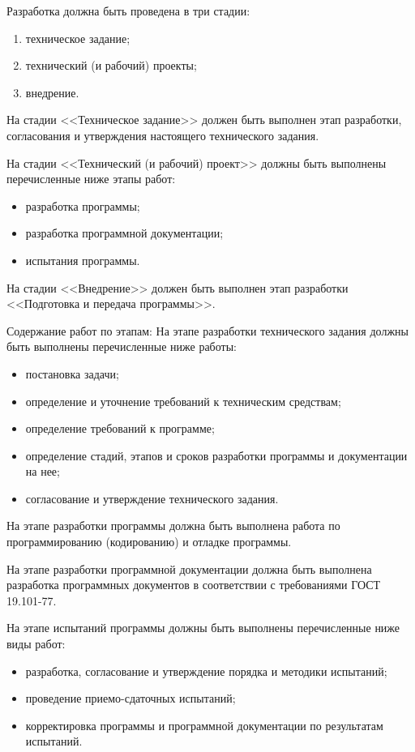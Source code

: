 \documentclass[a4page]{article}
\begin{document}
Разработка должна быть проведена в три стадии:

\begin{enumerate}
  \item техническое задание;
  \item технический (и рабочий) проекты;
  \item внедрение.
\end{enumerate}

На стадии <<Техническое задание>> должен быть выполнен этап разработки, согласования и утверждения настоящего технического задания.

На стадии <<Технический (и рабочий) проект>> должны быть выполнены перечисленные ниже этапы работ:

\begin{itemize}
  \item разработка программы;
  \item разработка программной документации;
  \item испытания программы.
\end{itemize}

На стадии <<Внедрение>> должен быть выполнен этап разработки <<Подготовка и передача программы>>.

Содержание работ по этапам:
На этапе разработки технического задания должны быть выполнены перечисленные ниже работы:

\begin{itemize}
  \item постановка задачи;
  \item определение и уточнение требований к техническим средствам;
  \item определение требований к программе;
  \item определение стадий, этапов и сроков разработки программы и документации на нее;
  \item согласование и утверждение технического задания.
\end{itemize}

На этапе разработки программы должна быть выполнена работа по программированию (кодированию) и отладке программы.

На этапе разработки программной документации должна быть выполнена разработка программных документов в соответствии с требованиями ГОСТ 19.101-77.

На этапе испытаний программы должны быть выполнены перечисленные ниже виды работ:

\begin{itemize}
  \item разработка, согласование и утверждение порядка и методики испытаний;
  \item проведение приемо-сдаточных испытаний;
  \item корректировка программы и программной документации по результатам испытаний.
\end{itemize}
\end{document}

